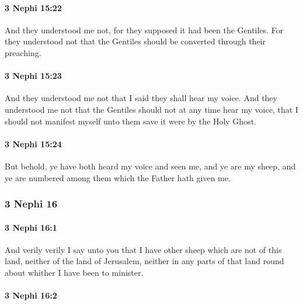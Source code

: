		\paragraph{3 Nephi 15:22} %
			\label{3NEPHI-15-22}

			And they understood me not,
			for they supposed it had been the Gentiles.
			For they understood not
			that the Gentiles should be converted through their preaching.

		\paragraph{3 Nephi 15:23} %
			\label{3NEPHI-15-23}

			And they understood me not
			that I said they shall hear my voice.
			And they understood me not
			that the Gentiles should not at any time hear my voice,
			that I should not manifest myself unto them
			save it were by the Holy Ghost.

		\paragraph{3 Nephi 15:24} %
			\label{3NEPHI-15-24}

			But behold, ye have both heard my voice and seen me,
			and ye are my sheep,
			and ye are numbered among them which the Father hath given me.

	\subsubsection{3 Nephi 16} %
		\label{3NEPHI-16}
		
		\paragraph{3 Nephi 16:1} %
			\label{3NEPHI-16-1}

			And verily verily I say unto you
			that I have other sheep which are not of this land,
			neither of the land of Jerusalem,
			neither in any parts of that land round about whither I have been to minister.

		\paragraph{3 Nephi 16:2} %
			\label{3NEPHI-16-2}

